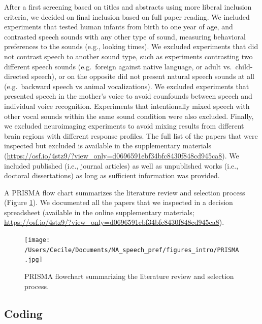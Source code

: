 \documentclass[man]{apa6}
\begin{document}
After a first screening based on titles and abstracts using more liberal
inclusion criteria, we decided on final inclusion based on full paper
reading. We included experiments that tested human infants from birth to
one year of age, and contrasted speech sounds with any other type of
sound, measuring behavioral preferences to the sounds (e.g., looking
times). We excluded experiments that did not contrast speech to another
sound type, such as experiments contrasting two different speech sounds
(e.g.~foreign against native language, or adult vs.~child-directed
speech), or on the opposite did not present natural speech sounds at all
(e.g.~backward speech vs animal vocalizations). We excluded experiments
that presented speech in the mother's voice to avoid counfounds between
speech and individual voice recognition. Experiments that intentionally
mixed speech with other vocal sounds within the same sound condition
were also excluded. Finally, we excluded neuroimaging experiments to
avoid mixing results from different brain regions with different
response profiles. The full list of the papers that were inspected but
excluded is available in the supplementary materials
(\url{https://osf.io/4stz9/?view_only=d0696591ebf34bfc8430f848cd945ca8}).
We included published (i.e., journal articles) as well as unpublished
works (i.e., doctoral dissertations) as long as sufficient information
was provided.

A PRISMA flow chart summarizes the literature review and selection
process (Figure \ref{fig:prisma}). We documented all the papers that we
inspected in a decision spreadsheet (available in the online
supplementary materials;
\url{https://osf.io/4stz9/?view_only=d0696591ebf34bfc8430f848cd945ca8}).

\begin{figure}
\centering
\texttt{[image: /Users/Cecile/Documents/MA\_speech\_pref/figures\_intro/PRISMA.jpg]}
\caption{\label{fig:prisma}PRISMA flowchart summarizing the literature
review and selection process.}
\end{figure}

\subsection{Coding}\label{coding}
\end{document}
